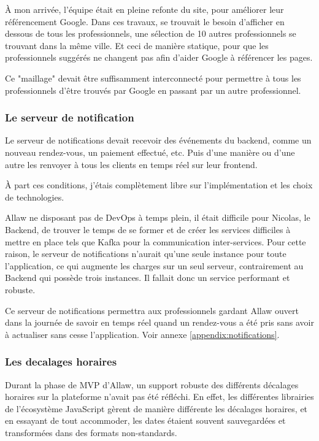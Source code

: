 À mon arrivée, l'équipe était en pleine refonte du site, pour améliorer leur
référencement Google. Dans ces travaux, se trouvait le besoin d'afficher en
dessous de tous les professionnels, une sélection de 10 autres professionnels
se trouvant dans la même ville. Et ceci de manière statique, pour que les
professionnels suggérés ne changent pas afin d'aider Google à référencer les
pages.

Ce "maillage" devait être suffisamment interconnecté pour permettre à tous les
professionnels d'être trouvés par Google en passant par un autre professionnel.

\subsubsection{Le serveur de notification}

Le serveur de notifications devait recevoir des événements du backend, comme
un nouveau rendez-vous, un paiement effectué, etc. Puis d'une manière ou d'une
autre les renvoyer à tous les clients en temps réel sur leur frontend.

À part ces conditions, j'étais complètement libre sur l'implémentation et les
choix de technologies.

Allaw ne disposant pas de DevOps à temps plein, il était difficile pour Nicolas,
le Backend, de trouver le temps de se former et de créer les services difficiles
à mettre en place tels que Kafka pour la communication inter-services. Pour
cette raison, le serveur de notifications n'aurait qu'une seule instance
pour toute l'application, ce qui augmente les charges sur un seul serveur,
contrairement au Backend qui possède trois instances. Il fallait donc un service
performant et robuste.

Ce serveur de notifications permettra aux professionnels gardant Allaw ouvert
dans la journée de savoir en temps réel quand un rendez-vous a été pris sans
avoir à actualiser sans cesse l'application. Voir annexe \ref{appendix:notifications}.

\subsubsection{Les decalages horaires}

Durant la phase de MVP d'Allaw, un support robuste des différents décalages
horaires sur la plateforme n'avait pas été réfléchi. En effet, les différentes
librairies de l'écosystème JavaScript gèrent de manière différente les
décalages horaires, et en essayant de tout accommoder, les dates étaient souvent
sauvegardées et transformées dans des formats non-standards.

